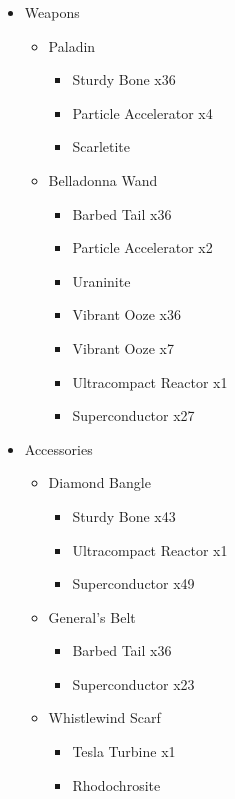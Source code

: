 \begin{upgrade}
	\begin{itemize}
		\item Weapons
			\begin{itemize}
				\item Paladin
					\begin{itemize}
						\item Sturdy Bone x36
						\item Particle Accelerator x4
						\item Scarletite
					\end{itemize}
				\item Belladonna Wand
					\begin{itemize}
						\item Barbed Tail x36
						\item Particle Accelerator x2
						\item Uraninite
						\item Vibrant Ooze x36
						\item Vibrant Ooze x7
						\item Ultracompact Reactor x1
						\item Superconductor x27						
					\end{itemize}
			\end{itemize}
		\item Accessories
			\begin{itemize}
				\item Diamond Bangle
					\begin{itemize}
						\item Sturdy Bone x43
						\item Ultracompact Reactor x1
						\item Superconductor x49
					\end{itemize}
				\item General's Belt
					\begin{itemize}
						\item Barbed Tail x36
						\item Superconductor x23
					\end{itemize}				
				\item Whistlewind Scarf
					\begin{itemize}
						\item Tesla Turbine x1
						\item Rhodochrosite
					\end{itemize}				
			\end{itemize}
	\end{itemize}
\end{upgrade}

